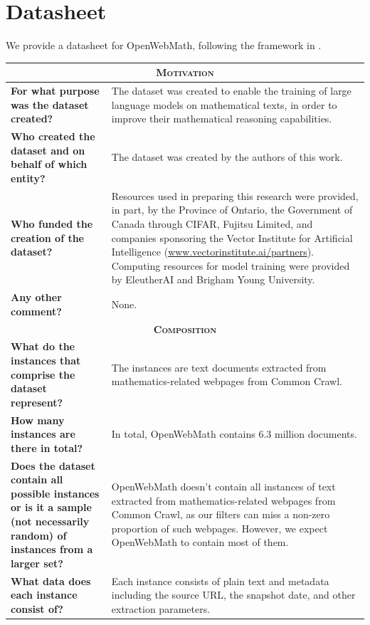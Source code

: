 \clearpage
\section{Datasheet}

We provide a datasheet for OpenWebMath, following the framework in \citet{gebru2021datasheets}.
\begin{longtable}{p{6cm}|p{6cm}}
    \toprule
    \multicolumn{2}{c}{\textsc{\textbf{Motivation}}} \\
    \midrule
    \textbf{For what purpose was the dataset created?} & The dataset was created to enable the training of large language models on mathematical texts, in order to improve their mathematical reasoning capabilities.\\ \midrule
    \textbf{Who created the dataset and on behalf of which entity?} & The dataset was created by the authors of this work. \\ \midrule
    \textbf{Who funded the creation of the dataset?} & Resources used in preparing this research were provided, in part, by the Province of Ontario, the Government of Canada through CIFAR, Fujitsu Limited, and companies sponsoring the Vector Institute for Artificial Intelligence (\url{www.vectorinstitute.ai/partners}). Computing resources for model training were provided by EleutherAI and Brigham Young University. \\ \midrule
    \textbf{Any other comment?} &  None. \\ \midrule
    \multicolumn{2}{c}{\textsc{\textbf{Composition}}} \\ \midrule
    \textbf{What do the instances that comprise the dataset represent?} & The instances are text documents extracted from mathematics-related webpages from Common Crawl. \\ \midrule
    \textbf{How many instances are there in total?} & In total, OpenWebMath contains 6.3 million documents. \\ \midrule
    \textbf{Does the dataset contain all possible instances or is it a sample (not necessarily random) of instances from a larger set?} & OpenWebMath doesn't contain all instances of text extracted from mathematics-related webpages from Common Crawl, as our filters can miss a non-zero proportion of such webpages. However, we expect OpenWebMath to contain most of them. \\ \midrule
    \textbf{What data does each instance consist of?} & Each instance consists of plain text and metadata including the source URL, the snapshot date, and other extraction parameters. \\ \midrule

\end{longtable}
